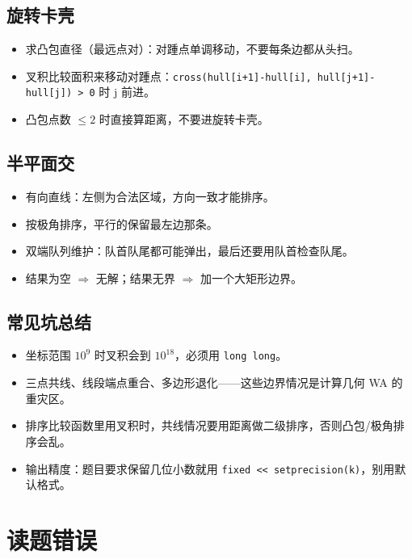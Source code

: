 \documentclass[UTF8,openany,oneside,zihao=-4]{ctexbook}
\begin{document}
\section{旋转卡壳}

\begin{itemize}
  \item 求凸包直径（最远点对）：对踵点单调移动，不要每条边都从头扫。
  \item 叉积比较面积来移动对踵点：\lstinline|cross(hull[i+1]-hull[i], hull[j+1]-hull[j]) > 0| 时 j 前进。
  \item 凸包点数 $\le 2$ 时直接算距离，不要进旋转卡壳。
\end{itemize}

\section{半平面交}

\begin{itemize}
  \item 有向直线：左侧为合法区域，方向一致才能排序。
  \item 按极角排序，平行的保留最左边那条。
  \item 双端队列维护：队首队尾都可能弹出，最后还要用队首检查队尾。
  \item 结果为空 $\Rightarrow$ 无解；结果无界 $\Rightarrow$ 加一个大矩形边界。
\end{itemize}

\section{常见坑总结}

\begin{tip}
\begin{itemize}
  \item 坐标范围 $10^9$ 时叉积会到 $10^{18}$，必须用 \lstinline|long long|。
  \item 三点共线、线段端点重合、多边形退化——这些边界情况是计算几何 WA 的重灾区。
  \item 排序比较函数里用叉积时，共线情况要用距离做二级排序，否则凸包/极角排序会乱。
  \item 输出精度：题目要求保留几位小数就用 \lstinline|fixed << setprecision(k)|，别用默认格式。
\end{itemize}
\end{tip}

\chapter{读题错误}
\end{document}
